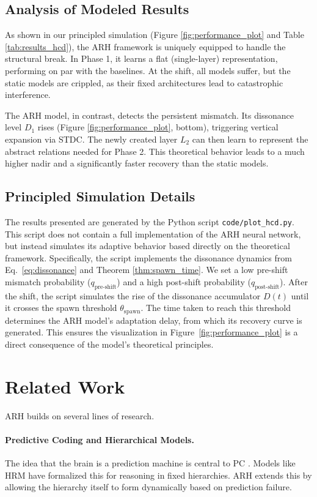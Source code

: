\documentclass{article}
\begin{document}
\subsection{Analysis of Modeled Results}
As shown in our principled simulation (Figure \ref{fig:performance_plot} and Table \ref{tab:results_hcd}), the ARH framework is uniquely equipped to handle the structural break. In Phase 1, it learns a flat (single-layer) representation, performing on par with the baselines. At the shift, all models suffer, but the static models are crippled, as their fixed architectures lead to catastrophic interference.

The ARH model, in contrast, detects the persistent mismatch. Its dissonance level $D_1$ rises (Figure \ref{fig:performance_plot}, bottom), triggering vertical expansion via STDC. The newly created layer $L_2$ can then learn to represent the abstract relations needed for Phase 2. This theoretical behavior leads to a much higher nadir and a significantly faster recovery than the static models.

\subsection{Principled Simulation Details}
The results presented are generated by the Python script \texttt{code/plot\_hcd.py}. This script does not contain a full implementation of the ARH neural network, but instead simulates its adaptive behavior based directly on the theoretical framework. Specifically, the script implements the dissonance dynamics from Eq.~\ref{eq:dissonance} and Theorem \ref{thm:spawn_time}. We set a low pre-shift mismatch probability ($q_{\text{pre-shift}}$) and a high post-shift probability ($q_{\text{post-shift}}$). After the shift, the script simulates the rise of the dissonance accumulator $D(t)$ until it crosses the spawn threshold $\theta_{\text{spawn}}$. The time taken to reach this threshold determines the ARH model's adaptation delay, from which its recovery curve is generated. This ensures the visualization in Figure~\ref{fig:performance_plot} is a direct consequence of the model's theoretical principles.

\section{Related Work}
ARH builds on several lines of research.
\paragraph{Predictive Coding and Hierarchical Models.} The idea that the brain is a prediction machine is central to PC \citep{Rao1999}. Models like HRM \citep{HRM2025} have formalized this for reasoning in fixed hierarchies. ARH extends this by allowing the hierarchy itself to form dynamically based on prediction failure.
\end{document}
